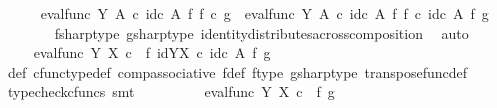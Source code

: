 \begin{isabellebody}
\ \ \ \ \isamarkupfalse%
\ {\isachardoublequoteopen}eval{\isacharunderscore}{\kern0pt}func\ Y\ A\ {\isasymcirc}\isactrlsub c\ id\isactrlsub c\ A\ {\isasymtimes}\isactrlsub f\ f\isactrlsup {\isasymsharp}\ {\isasymcirc}\isactrlsub c\ g\isactrlsup {\isasymsharp}\ {\isacharequal}{\kern0pt}\ eval{\isacharunderscore}{\kern0pt}func\ Y\ A\ {\isasymcirc}\isactrlsub c\ {\isacharparenleft}{\kern0pt}id\isactrlsub c\ A\ {\isasymtimes}\isactrlsub f\ f\isactrlsup {\isasymsharp}{\isacharparenright}{\kern0pt}\ {\isasymcirc}\isactrlsub c\ {\isacharparenleft}{\kern0pt}id\isactrlsub c\ A\ {\isasymtimes}\isactrlsub f\ g\isactrlsup {\isasymsharp}{\isacharparenright}{\kern0pt}{\isachardoublequoteclose}\isanewline
\ \ \ \ \ \ \isamarkupfalse%
\ fsharp{\isacharunderscore}{\kern0pt}type\ gsharp{\isacharunderscore}{\kern0pt}type\ identity{\isacharunderscore}{\kern0pt}distributes{\isacharunderscore}{\kern0pt}across{\isacharunderscore}{\kern0pt}composition\ \isamarkupfalse%
\ auto\isanewline
\ \ \ \ \isamarkupfalse%
\ \isamarkupfalse%
\ {\isachardoublequoteopen}{\isachardot}{\kern0pt}{\isachardot}{\kern0pt}{\isachardot}{\kern0pt}\ {\isacharequal}{\kern0pt}\ eval{\isacharunderscore}{\kern0pt}func\ Y\ X\ {\isasymcirc}\isactrlsub c\ {\isacharparenleft}{\kern0pt}{\isasympsi}\ {\isasymtimes}\isactrlsub f\ id{\isacharparenleft}{\kern0pt}Y\isactrlbsup X\isactrlesup {\isacharparenright}{\kern0pt}{\isacharparenright}{\kern0pt}\ {\isasymcirc}\isactrlsub c\ {\isacharparenleft}{\kern0pt}id\isactrlsub c\ A\ {\isasymtimes}\isactrlsub f\ g\isactrlsup {\isasymsharp}{\isacharparenright}{\kern0pt}{\isachardoublequoteclose}\isanewline
\ \ \ \ \ \ \isamarkupfalse%
\ {\isasympsi}{\isacharunderscore}{\kern0pt}def\ cfunc{\isacharunderscore}{\kern0pt}type{\isacharunderscore}{\kern0pt}def\ comp{\isacharunderscore}{\kern0pt}associative\ f{\isacharunderscore}{\kern0pt}def\ f{\isacharunderscore}{\kern0pt}type\ gsharp{\isacharunderscore}{\kern0pt}type\ transpose{\isacharunderscore}{\kern0pt}func{\isacharunderscore}{\kern0pt}def\ \isamarkupfalse%
\ {\isacharparenleft}{\kern0pt}typecheck{\isacharunderscore}{\kern0pt}cfuncs{\isacharcomma}{\kern0pt}\ smt{\isacharparenright}{\kern0pt}\isanewline
\ \ \ \ \isamarkupfalse%
\ \isamarkupfalse%
\ {\isachardoublequoteopen}{\isachardot}{\kern0pt}{\isachardot}{\kern0pt}{\isachardot}{\kern0pt}\ {\isacharequal}{\kern0pt}\ eval{\isacharunderscore}{\kern0pt}func\ Y\ X\ {\isasymcirc}\isactrlsub c\ {\isacharparenleft}{\kern0pt}{\isasympsi}\ {\isasymtimes}\isactrlsub f\ g\isactrlsup {\isasymsharp}{\isacharparenright}{\kern0pt}{\isachardoublequoteclose}\isanewline

\end{isabellebody}
